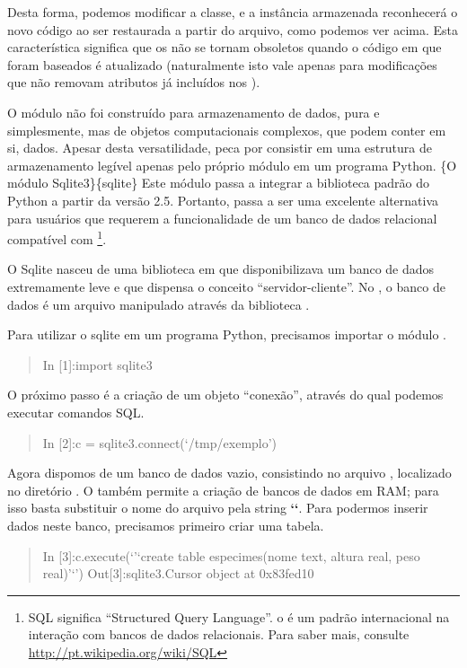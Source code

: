 \documentclass[a4paper,10pt,brazil]{sphinxmanual}
\begin{document}
Desta forma, podemos modificar a classe, e a instância armazenada
reconhecerá o novo código ao ser restaurada a partir do arquivo,
como podemos ver acima. Esta característica significa que os
 não se tornam obsoletos quando o código em que foram
baseados é atualizado (naturalmente isto vale apenas para
modificações que não removam atributos já incluídos nos
).

O módulo  não foi construído para armazenamento de dados,
pura e simplesmente, mas de objetos computacionais complexos, que
podem conter em si, dados. Apesar desta versatilidade, peca por
consistir em uma estrutura de armazenamento legível apenas pelo
próprio módulo  em um programa Python.
\{O módulo Sqlite3\}\{sqlite\} Este módulo passa a integrar a
biblioteca padrão do Python a partir da versão 2.5. Portanto, passa
a ser uma excelente alternativa para usuários que requerem a
funcionalidade de um banco de dados relacional compatível com
 \footnote{
SQL significa ``Structured Query Language''. o  é um padrão
internacional na interação com bancos de dados relacionais. Para
saber mais, consulte \href{http://pt.wikipedia.org/wiki/SQL}{http://pt.wikipedia.org/wiki/SQL}
}.

O Sqlite nasceu de uma biblioteca em  que disponibilizava um
banco de dados extremamente leve e que dispensa o conceito
``servidor-cliente''. No , o banco de dados é um arquivo
manipulado através da biblioteca .

Para utilizar o sqlite em um programa Python, precisamos importar o
módulo .
\begin{quote}

In {[}1{]}:import sqlite3
\end{quote}

O próximo passo é a criação de um objeto ``conexão'', através do qual
podemos executar comandos SQL.
\begin{quote}

In {[}2{]}:c = sqlite3.connect(`/tmp/exemplo')
\end{quote}

Agora dispomos de um banco de dados vazio, consistindo no arquivo
, localizado no diretório . O  também
permite a criação de bancos de dados em RAM; para isso basta
substituir o nome do arquivo pela string {\color{red}\bfseries{}{}`{}`}. Para
podermos inserir dados neste banco, precisamos primeiro criar uma
tabela.
\begin{quote}

In {[}3{]}:c.execute(`'`create table especimes(nome text, altura real,
peso real)'`') Out{[}3{]}:sqlite3.Cursor object at 0x83fed10
\end{quote}
\end{document}
